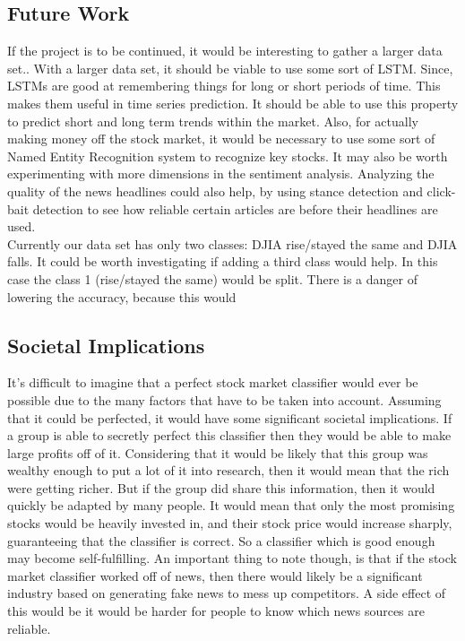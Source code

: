 \documentclass[11pt,a4paper]{article}
\begin{document}
\subsection{Future Work}
If the project is to be continued, it would be interesting to gather a larger data set.. With a larger data set, it should be viable to use some sort of LSTM. Since, LSTMs are good at remembering things for long or short periods of time. This makes them useful in time series prediction. It should be able to use this property to predict short and long term trends within the market. Also, for actually making money off the stock market, it would be necessary to use some sort of Named Entity Recognition system to recognize key stocks. It may also be worth experimenting with more dimensions in the sentiment analysis. Analyzing the quality of the news headlines could also help, by using stance detection and click-bait detection to see how reliable certain articles are before their headlines are used.\\

Currently our data set has only two classes: DJIA rise/stayed the same and DJIA falls. It could be worth investigating if adding a third class would help. In this case the class 1 (rise/stayed the same) would be split. There is a danger of lowering the accuracy, because this would

\subsection{Societal Implications}
It's difficult to imagine that a perfect stock market classifier would ever be possible due to the many factors that have to be taken into account. Assuming that it could be perfected, it would have some significant societal implications. If a group is able to secretly perfect this classifier  then they would be able to make large profits off of it. Considering that it would be likely that this group was wealthy enough to put a lot of it into research, then it would mean that the rich were getting richer. But if the group did share this information, then it would quickly be adapted by many people. It would mean that only the most promising stocks would be heavily invested in, and their stock price would increase sharply,  guaranteeing that the classifier is correct. So a classifier which is good enough may become self-fulfilling. An important thing to note though, is that if the stock market classifier worked off of news, then there would likely be a significant industry based on generating fake news to mess up competitors. A side effect of this would be it would be harder for people to know which news sources are reliable.
\end{document}
